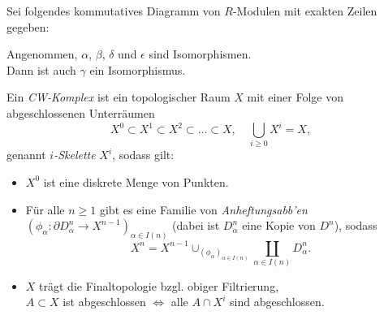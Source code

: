 \documentclass{cheat-sheet}
\begin{document}
\begin{lem}
  Sei folgendes kommutatives Diagramm von $R$-Modulen mit exakten Zeilen gegeben:
  \begin{center}
  \end{center}
  Angenommen, $\alpha$, $\beta$, $\delta$ und $\epsilon$ sind Isomorphismen.\\
  Dann ist auch $\gamma$ ein Isomorphismus.
\end{lem}


\begin{defn}
  Ein \emph{CW-Komplex} ist ein topologischer Raum $X$ mit einer Folge von abgeschlossenen Unterräumen
  \[
    X^0 \subset X^1 \subset X^2 \subset \ldots \subset X, \quad
    \bigcup_{i \geq 0} X^i = X,
  \]
  genannt \emph{$i$-Skelette} $X^i$, sodass gilt:
  \begin{itemize}
    \item $X^0$ ist eine diskrete Menge von Punkten.
    \item Für alle $n \geq 1$ gibt es eine Familie von \emph{Anheftungsabb'en} $(\phi_\alpha : \partial D^n_\alpha \to X^{n-1})_{\alpha \in I(n)}$ (dabei ist $D^n_\alpha$ eine Kopie von $D^n$), sodass
    \[ X^n = X^{n-1} \cup_{(\phi_\alpha)_{\alpha \in I(n)}} \coprod_{\alpha \in I(n)} D^n_\alpha. \]
    \item $X$ trägt die Finaltopologie bzgl. obiger Filtrierung, \dh{} \\
    $A \subset X$ ist abgeschlossen $\iff$ alle $A \cap X^i$ sind abgeschlossen.
  \end{itemize}
\end{defn}
\end{document}
